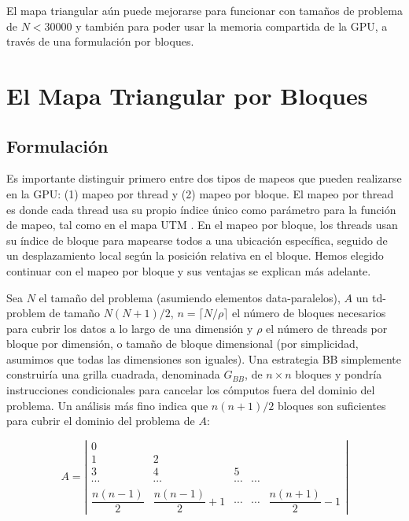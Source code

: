 \documentclass[twocolumn,10pt,a4paper]{article}
\begin{document}
El mapa triangular aún puede mejorarse para funcionar con tamaños de problema
de $N < 30000$ y también para poder usar la memoria compartida de la GPU,
a través de una formulación por bloques.

\section{El Mapa Triangular por Bloques}
\label{sec:blockwise}

\subsection{Formulación}

Es importante distinguir primero entre dos tipos de mapeos que pueden
realizarse en la GPU: (1) mapeo por thread y (2) mapeo por bloque. El mapeo
por thread es donde cada thread usa su propio índice único como parámetro para
la función de mapeo, tal como en el mapa UTM \cite{ref1}. En el mapeo por
bloque, los threads usan su índice de bloque para mapearse todos a una
ubicación específica, seguido de un desplazamiento local según la posición
relativa en el bloque. Hemos elegido continuar con el mapeo por bloque y sus
ventajas se explican más adelante.

Sea $N$ el tamaño del problema (asumiendo elementos data-paralelos), $A$ un
td-problem de tamaño $N(N+1)/2$, $n = \lceil N/\rho \rceil$ el número de
bloques necesarios para cubrir los datos a lo largo de una dimensión y $\rho$
el número de threads por bloque por dimensión, o tamaño de bloque dimensional
(por simplicidad, asumimos que todas las dimensiones son iguales). Una
estrategia BB simplemente construiría una grilla cuadrada, denominada $G_{BB}$,
de $n \times n$ bloques y pondría instrucciones condicionales para cancelar los
cómputos fuera del dominio del problema. Un análisis más fino indica que
$n(n+1)/2$ bloques son suficientes para cubrir el dominio del problema de $A$:

\begin{equation}
A = \left|
\begin{array}{ccccc}
0 & & & & \\
1 & 2 & & & \\
3 & 4 & 5 & & \\
\cdots & \cdots & \cdots & \cdots & \\
\dfrac{n(n-1)}{2} & \dfrac{n(n-1)}{2}+1 & \cdots & \cdots & \dfrac{n(n+1)}{2}-1
\end{array}
\right|
\label{eq:A}
\end{equation}
\end{document}

